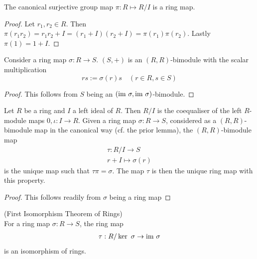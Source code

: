 \begin{corollary}
    The canonical surjective group map $\pi: R\mapsto R/I$ is a ring map.
\end{corollary}
\begin{proof}
    Let $r_1,r_2\in R$. Then $\pi(r_1r_2)=r_1r_2+I=(r_1+I)(r_2+I)=\pi(r_1)\pi(r_2)$. Lastly $\pi(1)=1+I$.
\end{proof}
\begin{lemma}
    Consider a ring map $\sigma: R\rightarrow S$. $(S,+)$ is an $(R,R)$-bimodule with the scalar multiplication
    $$
        rs := \sigma(r)s \quad (r\in R, s\in S)
    $$
\end{lemma}
\begin{proof}
    This follows from $S$ being an $(\im \ \sigma,\im \ \sigma)$-bimodule. 
\end{proof}
\begin{theorem}
    Let $R$ be a ring and $I$ a left ideal of $R$. Then $R/I$ is the coequaliser of the left $R$-module maps $0,\iota: I\rightarrow R$. Given a ring map $\sigma: R\rightarrow S$, considered as a $(R,R)$-bimodule map in the canonical way (cf. the prior lemma), the $(R,R)$-bimodule map 
    \begin{gather*}
        \tau : R/I \rightarrow S\\
        r+I \mapsto \sigma(r)
    \end{gather*}
    is the unique map such that $\tau\pi=\sigma$. The map $\tau$ is then the unique ring map with this property. 
\end{theorem}
\begin{proof}
    This follows readily from $\sigma$ being a ring map
\end{proof}
\begin{corollary}\label{FirstIsomorphismTheoremOfRings}(First Isomorphism Theorem of Rings)\\
    For a ring map $\sigma: R\rightarrow S$, the ring map 
    \begin{gather*}
        \tau: R/\ker\ \sigma \rightarrow \mathrm{im} \ \sigma
    \end{gather*}
    is an isomorphism of rings. 
\end{corollary}
